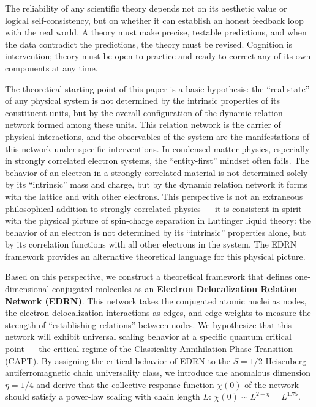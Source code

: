 \documentclass[prb,reprint,twocolumn,superscriptaddress]{revtex4-2}
\begin{document}
The reliability of any scientific theory depends not on its aesthetic value or logical self-consistency, but on whether it can establish an honest feedback loop with the real world. A theory must make precise, testable predictions, and when the data contradict the predictions, the theory must be revised. Cognition is intervention; theory must be open to practice and ready to correct any of its own components at any time.

The theoretical starting point of this paper is a basic hypothesis: the ``real state'' of any physical system is not determined by the intrinsic properties of its constituent units, but by the overall configuration of the dynamic relation network formed among these units. This relation network is the carrier of physical interactions, and the observables of the system are the manifestations of this network under specific interventions. In condensed matter physics, especially in strongly correlated electron systems, the ``entity-first'' mindset often fails. The behavior of an electron in a strongly correlated material is not determined solely by its ``intrinsic'' mass and charge, but by the dynamic relation network it forms with the lattice and with other electrons. This perspective is not an extraneous philosophical addition to strongly correlated physics --- it is consistent in spirit with the physical picture of spin-charge separation in Luttinger liquid theory: the behavior of an electron is not determined by its ``intrinsic'' properties alone, but by its correlation functions with all other electrons in the system. The EDRN framework provides an alternative theoretical language for this physical picture.

Based on this perspective, we construct a theoretical framework that defines one-dimensional conjugated molecules as an \textbf{Electron Delocalization Relation Network (EDRN)}. This network takes the conjugated atomic nuclei as nodes, the electron delocalization interactions as edges, and edge weights to measure the strength of ``establishing relations'' between nodes. We hypothesize that this network will exhibit universal scaling behavior at a specific quantum critical point --- the critical regime of the Classicality Annihilation Phase Transition (CAPT). By assigning the critical behavior of EDRN to the $S = 1/2$ Heisenberg antiferromagnetic chain universality class, we introduce the anomalous dimension $\eta = 1/4$ and derive that the collective response function $\chi(0)$ of the network should satisfy a power-law scaling with chain length $L$: $\chi(0) \sim L^{2-\eta} = L^{1.75}$.
\end{document}
